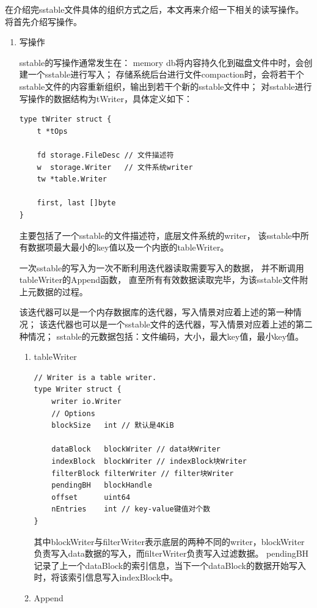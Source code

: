 \begin{enumerate}
				在介绍完sstable文件具体的组织方式之后，本文再来介绍一下相关的读写操作。
				将首先介绍写操作。

				\begin{enumerate}
					\item 写操作
					
					sstable的写操作通常发生在：
memory db将内容持久化到磁盘文件中时，会创建一个sstable进行写入；
存储系统后台进行文件compaction时，会将若干个sstable文件的内容重新组织，输出到若干个新的sstable文件中；
对sstable进行写操作的数据结构为tWriter，具体定义如下：

\begin{lstlisting}[caption=tWriter , label=code_radds_storage_tWriter]
type tWriter struct {
	t *tOps
	
	fd storage.FileDesc // 文件描述符
	w  storage.Writer   // 文件系统writer
	tw *table.Writer
	
	first, last []byte
}
\end{lstlisting}

主要包括了一个sstable的文件描述符，底层文件系统的writer，
该sstable中所有数据项最大最小的key值以及一个内嵌的tableWriter。

一次sstable的写入为一次不断利用迭代器读取需要写入的数据，
并不断调用tableWriter的Append函数，
直至所有有效数据读取完毕，为该sstable文件附上元数据的过程。

该迭代器可以是一个内存数据库的迭代器，写入情景对应着上述的第一种情况；
该迭代器也可以是一个sstable文件的迭代器，写入情景对应着上述的第二种情况；
sstable的元数据包括：文件编码，大小，最大key值，最小key值。


			\begin{enumerate}
				\item tableWriter

\begin{lstlisting}[caption=tableWriter , label=code_radds_storage_Writer]
// Writer is a table writer.
type Writer struct {
	writer io.Writer
	// Options
	blockSize   int // 默认是4KiB

	dataBlock   blockWriter // data块Writer
	indexBlock  blockWriter // indexBlock块Writer
	filterBlock filterWriter // filter块Writer
	pendingBH   blockHandle
	offset      uint64
	nEntries    int // key-value键值对个数
}				
\end{lstlisting}

			其中blockWriter与filterWriter表示底层的两种不同的writer，blockWriter负责写入data数据的写入，而filterWriter负责写入过滤数据。
			pendingBH记录了上一个dataBlock的索引信息，当下一个dataBlock的数据开始写入时，将该索引信息写入indexBlock中。
				\item Append 
				

\end{enumerate}
\end{enumerate}
\end{enumerate}
